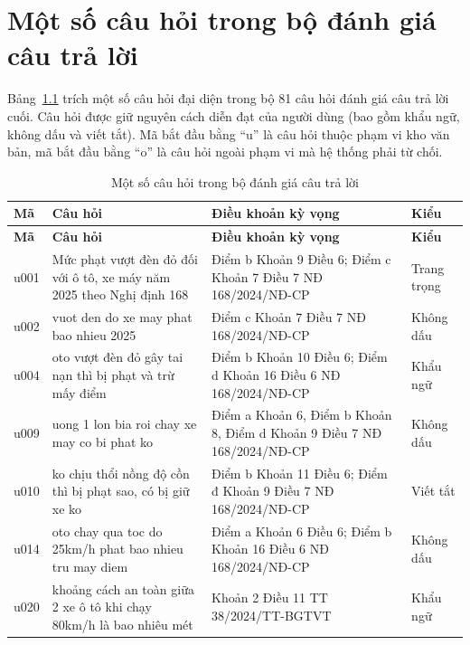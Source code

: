 \chapter{Một số câu hỏi trong bộ đánh giá câu trả lời}
\label{app:cau-hoi}
\sloppy

Bảng~\ref{tab:pl-cau-hoi} trích một số câu hỏi đại diện trong bộ 81 câu hỏi đánh giá câu trả lời cuối. Câu hỏi được giữ nguyên cách diễn đạt của người dùng (bao gồm khẩu ngữ, không dấu và viết tắt). Mã bắt đầu bằng ``u'' là câu hỏi thuộc phạm vi kho văn bản, mã bắt đầu bằng ``o'' là câu hỏi ngoài phạm vi mà hệ thống phải từ chối.

\begingroup
\small
\setlength{\tabcolsep}{4pt}
\renewcommand{\arraystretch}{1.15}
\begin{longtable}{@{}l >{\raggedright\arraybackslash}p{5.5cm} >{\raggedright\arraybackslash}p{6.2cm} >{\raggedright\arraybackslash}p{1.9cm}@{}}
\caption{Một số câu hỏi trong bộ đánh giá câu trả lời}
\label{tab:pl-cau-hoi}\\
\toprule
\textbf{Mã} & \textbf{Câu hỏi} & \textbf{Điều khoản kỳ vọng} & \textbf{Kiểu} \\
\midrule
\endfirsthead
\toprule
\textbf{Mã} & \textbf{Câu hỏi} & \textbf{Điều khoản kỳ vọng} & \textbf{Kiểu} \\
\midrule
\endhead
\bottomrule
\endfoot
u001 & Mức phạt vượt đèn đỏ đối với ô tô, xe máy năm 2025 theo Nghị định 168 & Điểm b Khoản 9 Điều 6; Điểm c Khoản 7 Điều 7 NĐ 168/2024/NĐ-CP & Trang trọng \\
u002 & vuot den do xe may phat bao nhieu 2025 & Điểm c Khoản 7 Điều 7 NĐ 168/2024/NĐ-CP & Không dấu \\
u004 & oto vượt đèn đỏ gây tai nạn thì bị phạt và trừ mấy điểm & Điểm b Khoản 10 Điều 6; Điểm d Khoản 16 Điều 6 NĐ 168/2024/NĐ-CP & Khẩu ngữ \\
u009 & uong 1 lon bia roi chay xe may co bi phat ko & Điểm a Khoản 6, Điểm b Khoản 8, Điểm d Khoản 9 Điều 7 NĐ 168/2024/NĐ-CP & Không dấu \\
u010 & ko chịu thổi nồng độ cồn thì bị phạt sao, có bị giữ xe ko & Điểm b Khoản 11 Điều 6; Điểm đ Khoản 9 Điều 7 NĐ 168/2024/NĐ-CP & Viết tắt \\
u014 & oto chay qua toc do 25km/h phat bao nhieu tru may diem & Điểm a Khoản 6 Điều 6; Điểm b Khoản 16 Điều 6 NĐ 168/2024/NĐ-CP & Không dấu \\
u020 & khoảng cách an toàn giữa 2 xe ô tô khi chạy 80km/h là bao nhiêu mét & Khoản 2 Điều 11 TT 38/2024/TT-BGTVT & Khẩu ngữ \\

\end{longtable}
